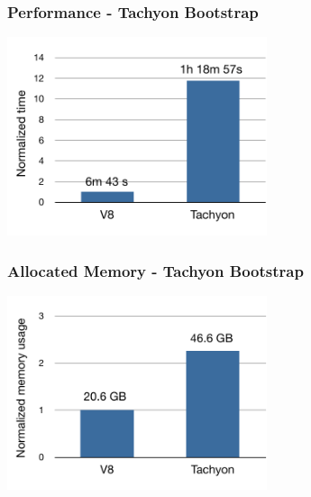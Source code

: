 \begin{frame}
\frametitle{\bf Performance - Tachyon Bootstrap}

\begin{center}
\includegraphics[width=3in]{images/perf-bootstrap}
\end{center}
\end{frame}

\begin{frame}
\frametitle{\bf Allocated Memory - Tachyon Bootstrap}

\begin{center}
\includegraphics[width=3in]{images/perf-bootstrap-mem}
\end{center}
\end{frame}
